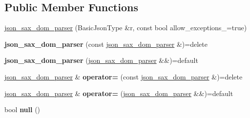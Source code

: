 \subsection*{Public Member Functions}
\begin{DoxyCompactItemize}
\item 
\hyperlink{classnlohmann_1_1detail_1_1json__sax__dom__parser_afc50fee0a92ce84afb84041ebbdfba80}{json\+\_\+sax\+\_\+dom\+\_\+parser} (Basic\+Json\+Type \&r, const bool allow\+\_\+exceptions\+\_\+=true)
\item 
\mbox{\label{classnlohmann_1_1detail_1_1json__sax__dom__parser_a0a00cd158d678e294f6e974cd9373c4b}} 
{\bfseries json\+\_\+sax\+\_\+dom\+\_\+parser} (const \hyperlink{classnlohmann_1_1detail_1_1json__sax__dom__parser}{json\+\_\+sax\+\_\+dom\+\_\+parser} \&)=delete
\item 
\mbox{\label{classnlohmann_1_1detail_1_1json__sax__dom__parser_ad6e588652d5a9cb647a3c32a6221f13e}} 
{\bfseries json\+\_\+sax\+\_\+dom\+\_\+parser} (\hyperlink{classnlohmann_1_1detail_1_1json__sax__dom__parser}{json\+\_\+sax\+\_\+dom\+\_\+parser} \&\&)=default
\item 
\mbox{\label{classnlohmann_1_1detail_1_1json__sax__dom__parser_a98448bf2cbc15d15e2eddc5a09a40a42}} 
\hyperlink{classnlohmann_1_1detail_1_1json__sax__dom__parser}{json\+\_\+sax\+\_\+dom\+\_\+parser} \& {\bfseries operator=} (const \hyperlink{classnlohmann_1_1detail_1_1json__sax__dom__parser}{json\+\_\+sax\+\_\+dom\+\_\+parser} \&)=delete
\item 
\mbox{\label{classnlohmann_1_1detail_1_1json__sax__dom__parser_aff928a07e40e4efb16b3ff9384f4401c}} 
\hyperlink{classnlohmann_1_1detail_1_1json__sax__dom__parser}{json\+\_\+sax\+\_\+dom\+\_\+parser} \& {\bfseries operator=} (\hyperlink{classnlohmann_1_1detail_1_1json__sax__dom__parser}{json\+\_\+sax\+\_\+dom\+\_\+parser} \&\&)=default
\item 
\mbox{\label{classnlohmann_1_1detail_1_1json__sax__dom__parser_abb06babaa861f123d8d0cb443b887d8a}} 
bool {\bfseries null} ()
\item 

\end{DoxyCompactItemize}
